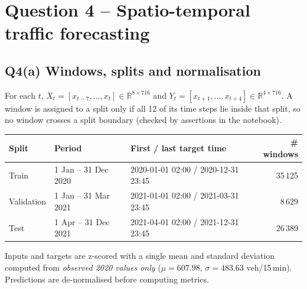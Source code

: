 \documentclass[11pt,a4paper]{article}
\begin{document}
\section{Question 4 -- Spatio-temporal traffic forecasting}

\subsection{Q4(a) Windows, splits and normalisation}
For each $t$, $X_t=[x_{t-7},\dots,x_t]\in\mathbb R^{8\times716}$ and $Y_t=[x_{t+1},\dots,x_{t+4}]\in\mathbb R^{4\times716}$.
A window is assigned to a split only if all 12 of its time steps lie inside that split, so no window crosses a split
boundary (checked by assertions in the notebook).
\begin{center}\small
\begin{tabular}{lllr}
\toprule
Split & Period & First / last target time & \# windows \\
\midrule
Train & 1 Jan -- 31 Dec 2020 & 2020-01-01 02:00 / 2020-12-31 23:45 & 35\,125\\
Validation & 1 Jan -- 31 Mar 2021 & 2021-01-01 02:00 / 2021-03-31 23:45 & 8\,629\\
Test & 1 Apr -- 31 Dec 2021 & 2021-04-01 02:00 / 2021-12-31 23:45 & 26\,389\\
\bottomrule
\end{tabular}
\end{center}
Inputs and targets are z-scored with a single mean and standard deviation computed from \emph{observed 2020 values only}
($\mu=607.98$, $\sigma=483.63$ veh/15\,min). Predictions are de-normalised before computing metrics.
\end{document}
